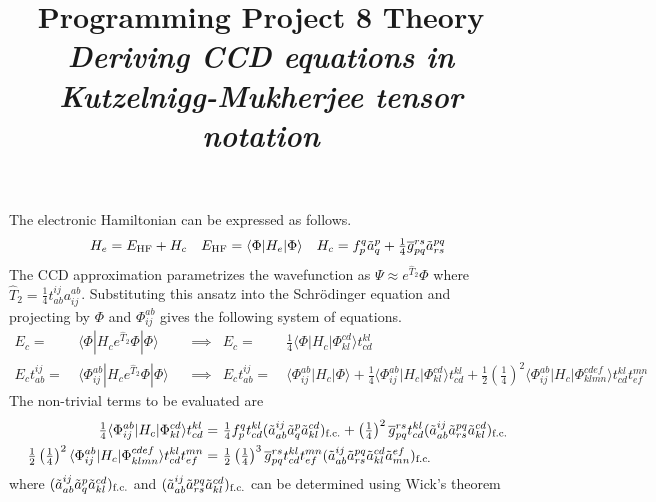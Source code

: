 \documentclass[11pt,fleqn]{article}
\title{Programming Project 8 Theory\\
\textit{Deriving CCD equations in Kutzelnigg-Mukherjee tensor notation}}
\date{}
\author{}
\newcommand{\F}{\Phi}        %
\newcommand{\Y}{\Psi}        %
\newcommand{\tl}{\ensuremath{\tilde}}
\newcommand{\ol}[1]{\ensuremath{\overline{#1}}}
\newcommand{\op}[1]{\ensuremath{\hat{#1}}}
\newcommand{\pr}[1]{\ensuremath{\left(#1\right)}}
\newcommand{\ip}[1]{\ensuremath{\langle#1\rangle}}
\theoremstyle{mystyle}
\begin{document}
\maketitle
\vspace{-1cm}

\noindent
The electronic Hamiltonian can be expressed as follows.
\begin{align}
&&
  H_e
=
  E_{\text{HF}}
+
  H_c
&&
  E_{\text{HF}}
=
  \ip{\F|H_e|\F}
&&
  H_c
=
  f_p^q
  \tl{a}_q^p
+
  \tfrac{1}{4}
  \ol{g}_{pq}^{rs}
  \tl{a}_{rs}^{pq}
\end{align}
The CCD approximation parametrizes the wavefunction as $\Y\approx e^{\op{T}_2}\F$ where $\op{T}_2=\tfrac{1}{4}t_{ab}^{ij}a_{ij}^{ab}$.
Substituting this ansatz into the Schr\"odinger equation and projecting by $\F$ and $\F_{ij}^{ab}$ gives the following system of equations.
\begin{align}
\label{ccd-energy-equation}
  E_c
=&\
  \ip{\F|H_ce^{\op{T}_2}\F|\F}
&&
  \implies
&
  E_c
=&\
  \tfrac{1}{4}
  \ip{\F|H_c|\F_{kl}^{cd}}t_{cd}^{kl}
\\
\label{ccd-t2-amplitude-equation}
  E_ct_{ab}^{ij}
=&\
  \ip{\F_{ij}^{ab}|H_ce^{\op{T}_2}\F|\F}
&&
  \implies
&
  E_ct_{ab}^{ij}
=&\
  \ip{\F_{ij}^{ab}|H_c|\F}
+
  \tfrac{1}{4}
  \ip{\F_{ij}^{ab}|H_c|\F_{kl}^{cd}}t_{cd}^{kl}
+
  \tfrac{1}{2}
  \pr{\tfrac{1}{4}}^2
  \ip{\F_{ij}^{ab}|H_c|\F_{klmn}^{cdef}}t_{cd}^{kl}t_{ef}^{mn}
\end{align}
The non-trivial terms to be evaluated are
\begin{align}
\label{ccd-matrix-elements}
&&
  \tfrac{1}{4}
  \ip{\F_{ij}^{ab}|H_c|\F_{kl}^{cd}}t_{cd}^{kl}
=&\
  \tfrac{1}{4}
  f_p^q
  t_{cd}^{kl}
  (\tl{a}_{ab}^{ij}\tl{a}_q^p\tl{a}_{kl}^{cd})_{\text{f.c.}}
+
  \pr{\tfrac{1}{4}}^2
  \ol{g}_{pq}^{rs}
  t_{cd}^{kl}
  (\tl{a}_{ab}^{ij}\tl{a}_{rs}^{pq}\tl{a}_{kl}^{cd})_{\text{f.c.}}
\\&&
  \tfrac{1}{2}
  \pr{\tfrac{1}{4}}^2
  \ip{\F_{ij}^{ab}|H_c|\F_{klmn}^{cdef}}
  t_{cd}^{kl}t_{ef}^{mn}
=&\
  \tfrac{1}{2}
  \pr{\tfrac{1}{4}}^3
  \ol{g}_{pq}^{rs}
  t_{cd}^{kl}t_{ef}^{mn}
  (\tl{a}_{ab}^{ij}\tl{a}_{rs}^{pq}\tl{a}_{kl}^{cd}\tl{a}_{mn}^{ef})_{\text{f.c.}}
\end{align}
where $(\tl{a}_{ab}^{ij}\tl{a}_q^p\tl{a}_{kl}^{cd})_{\text{f.c.}}$ and $(\tl{a}_{ab}^{ij}\tl{a}_{rs}^{pq}\tl{a}_{kl}^{cd})_{\text{f.c.}}$ can be determined using Wick's theorem
\end{document}
